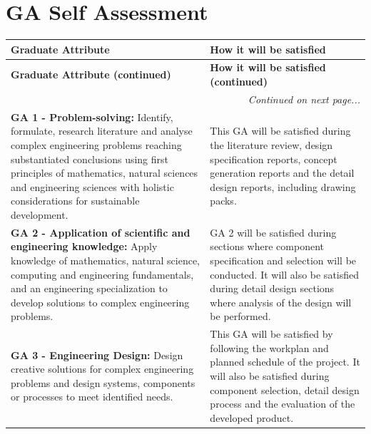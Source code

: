 \chapter{GA Self Assessment}


\begin{longtable}{|p{}|p{}|}



\hline
\textbf{Graduate Attribute} & \textbf{How it will be satisfied} \\
\hline
\endfirsthead

\hline
\textbf{Graduate Attribute (continued)} & \textbf{How it will be satisfied (continued)} \\
\hline
\endhead

\hline
\multicolumn{2}{r|}{\textit{Continued on next page...}} \\
\hline
\endfoot

\endlastfoot

\textbf{GA 1 - Problem-solving:} Identify, formulate, research literature and analyse complex engineering problems reaching substantiated conclusions using first principles of mathematics, natural sciences and engineering sciences with holistic considerations for sustainable development. 
& 
This GA will be satisfied during the literature review, design specification reports, concept generation reports and the detail design reports, including drawing packs. \\
\hline

\textbf{GA 2 - Application of scientific and engineering knowledge:} 
Apply knowledge of mathematics, natural science, computing and engineering fundamentals, and an engineering specialization to develop solutions to complex engineering problems. 
& 
GA 2 will be satisfied during sections where component specification and selection will be conducted. It will also be satisfied during detail design sections where analysis of the design will be performed. \\
\hline

\textbf{GA 3 - Engineering Design:} Design creative solutions for complex engineering problems and design systems, components or processes to meet identified needs.
& 
This GA will be satisfied by following the workplan and planned schedule of the project. It will also be satisfied during component selection, detail design process and the evaluation of the developed product. \\
\hline


\end{longtable}
